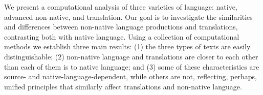 We present a computational analysis of three varieties of language: native, advanced non-native, and translation. Our goal is to investigate the similarities and differences between non-native language productions and translations, contrasting both with native language. Using a collection of computational methods we establish three main results: (1) the three types of texts are easily distinguishable; (2) non-native language and translations are closer to each other than each of them is to native language; and (3) some of these characteristics are source- and native-language-dependent, while others are not, reflecting, perhaps, unified principles that similarly affect translations and non-native language.
